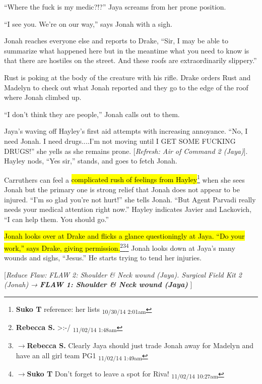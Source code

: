 ``Where the fuck is my medic?!?'' Jaya screams from her prone position.

``I see you.  We're on our way,'' says Jonah with a sigh.

Jonah reaches everyone else and reports to Drake, ``Sir, I may be able to summarize what happened here but in the meantime what you need to know is that there are hostiles on the street.  And these roofs are extraordinarily slippery.''

Rust is poking at the body of the creature with his rifle.  Drake orders Rust and Madelyn to check out what Jonah reported and they go to the edge of the roof where Jonah climbed up.

``I don't think they are people,'' Jonah calls out to them.



Jaya's waving off Hayley's first aid attempts with increasing annoyance.  ``No, I need Jonah.  I need drugs....I'm not moving until I GET SOME FUCKING DRUGS!'' she yells as she remains prone.  {[}\textit{Refresh: Air of Command 2 (Jaya)}{]}.  Hayley nods, ``Yes sir,'' stands, and goes to fetch Jonah.  

Carruthers can feel a \hl{complicated rush of feelings from Hayley}\footnote{\textbf{Suko T }reference: her lists \textsubscript{10/30/14 2:01am}} when she sees Jonah but the primary one is strong relief that Jonah does not appear to be injured.  ``I'm so glad you're not hurt!'' she tells Jonah.  ``But Agent Parvadi really needs your medical attention right now.''  Hayley indicates Javier and Lackovich, ``I can help them.  You should go.''

\hl{Jonah looks over at Drake and flicks a glance questioningly at Jaya.  ``Do your work,'' says Drake, giving permission.}\footnote{\textbf{Rebecca S. }\textgreater :-/ \textsubscript{11/02/14 1:48am}}\footnote{$\rightarrow$\textbf{Rebecca S. }Clearly Jaya should just trade Jonah away for Madelyn and have an all girl team PG1 \textsubscript{11/02/14 1:49am}}\footnote{$\rightarrow$\textbf{Suko T }Don't forget to leave a spot for Riva! \textsubscript{11/02/14 10:27am}}  Jonah looks down at Jaya's many wounds and sighs, ``Jesus.''  He starts trying to tend her injuries.

{[}\textit{Reduce Flaw: }\textit{ {\color[RGB]{255,0,0}FLAW 2: Shoulder \& Neck wound (Jaya). } }\textit{\textbf{ {\color[RGB]{255,0,0} } }}\textit{Surgical Field Kit 2 (Jonah)}\textit{ → }\textit{\textbf{ {\color[RGB]{255,0,0}FLAW 1: Shoulder \& Neck wound (Jaya)} }}{]} 

